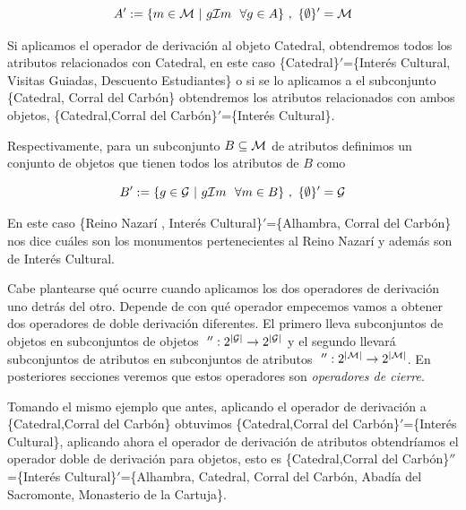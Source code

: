 \documentclass[oneside,openright,titlepage,numbers=noenddot,openany,headinclude,footinclude=true,
cleardoublepage=empty,abstractoff,BCOR=5mm,paper=a4,fontsize=12pt,main=spanish]{scrreprt}
\begin{document}
\begin{definition}
\begin{equation}\label{1}
    A' := \{m \in \M \ | \ g \I m \ \ \forall g \in A\} \ , \ \{\emptyset\}'=\M 
\end{equation} 
\end{definition}


Si aplicamos el operador de derivación al objeto Catedral, obtendremos todos los atributos relacionados con Catedral, en este caso \{Catedral\}$'$=\{Interés Cultural, Visitas Guiadas, Descuento Estudiantes\} o si se lo aplicamos a el subconjunto \{Catedral, Corral del Carbón\} obtendremos los atributos relacionados con ambos objetos, \{Catedral,Corral del Carbón\}$'$=\{Interés Cultural\}.

Respectivamente, para un subconjunto $B \subseteq \mathcal{M} $ de atributos definimos un conjunto de objetos que tienen todos los atributos de $B$ como

\begin{definition}
\begin{equation}\label{2}
    B':= \{g \in \G \ |\  g \I m \ \ \forall m \in B\} \ , \ \{\emptyset\}'=\G
\end{equation}
\end{definition}


En este caso \{Reino Nazarí , Interés Cultural\}$'$=\{Alhambra, Corral del Carbón\} nos dice cuáles son los monumentos pertenecientes al Reino Nazarí y además son de Interés Cultural. 

Cabe plantearse qué ocurre cuando aplicamos los dos operadores de derivación uno detrás del otro. Depende de con qué operador empecemos vamos a obtener dos operadores de doble derivación diferentes. El primero lleva subconjuntos de objetos en subconjuntos de objetos $ \ '':2^{|\mathcal{G}|} \to 2^{|\mathcal{G}|}$ y el segundo llevará subconjuntos de atributos en subconjuntos de atributos $\ '': 2^{|\mathcal{M}|} \to 2^{|\mathcal{M}|} $. En posteriores secciones veremos que estos operadores son \textit{operadores de cierre}.

\begin{exampleth}

 Tomando el mismo ejemplo que antes, aplicando el operador de derivación a \{Catedral,Corral del Carbón\} obtuvimos \{Catedral,Corral del Carbón\}$'$=\{Interés Cultural\}, aplicando ahora el operador de derivación de atributos obtendríamos el operador doble de derivación para objetos, esto es \{Catedral,Corral del Carbón\}$''$=\{Interés Cultural\}$'$=\{Alhambra, Catedral, Corral del Carbón, Abadía del Sacromonte, Monasterio de la Cartuja\}. 
\end{exampleth}
\end{document}
